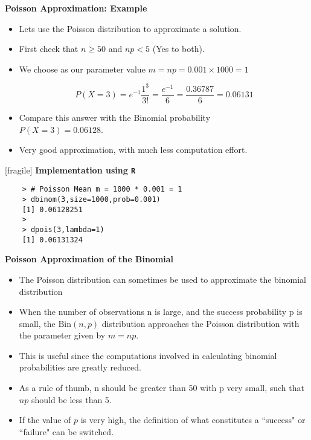 \documentclass[a4paper,12pt]{article}
\begin{document}
{
	\textbf{Poisson Approximation: Example}
	\begin{itemize}
		\item Lets use the Poisson distribution to approximate a solution.
		
		\item First check that $n \geq 50$ and $np <5$ (Yes to both).
		
		\item We choose as our parameter value $m = np = 0.001 \times 1000  = 1$
		
		\[P(X=3) = e^{-1}\frac{1^3}{3!} = \frac{e^{-1}}{6} = \frac{0.36787}{6} =  0.06131\]
		\item Compare this answer with the Binomial probability \\ $P(X=3) = 0.06128$.
		\item Very good approximation, with much less computation effort.
	\end{itemize}
}

[fragile]
	\textbf{Implementation using \texttt{R}}
	
	
	\begin{verbatim}
	> # Poisson Mean m = 1000 * 0.001 = 1
	> dbinom(3,size=1000,prob=0.001)
	[1] 0.06128251
	>
	> dpois(3,lambda=1)
	[1] 0.06131324
	\end{verbatim}
	
\medskip

{
\textbf{Poisson Approximation of the Binomial}
\begin{itemize}
\item The Poisson distribution can sometimes be used to approximate the binomial distribution
\item When the number of observations n is large, and the success probability p is small, the $\mbox{Bin}(n,p)$ distribution approaches the Poisson distribution with the parameter given by $m = np$.
\item This is useful since the computations involved in calculating binomial probabilities are greatly reduced.
\item As a rule of thumb, n should be greater than 50 with p very small, such that $np$ should be less than 5.
\item If the value of $p$ is very high, the definition of what constitutes a ``success" or ``failure" can be switched.
\end{itemize}
}
\end{document}
